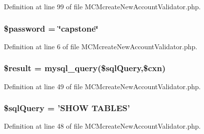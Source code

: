 Definition at line 99 of file M\-C\-Mcreate\-New\-Account\-Validator.\-php.

\hypertarget{_m_c_mcreate_new_account_validator_8php_a607686ef9f99ea7c42f4f3dd3dbb2b0d}{
\subsubsection[{\$password}]{\setlength{\rightskip}{0pt plus 5cm}\$password = \char`\"{}capstone\char`\"{}}}\label{_m_c_mcreate_new_account_validator_8php_a607686ef9f99ea7c42f4f3dd3dbb2b0d}


Definition at line 6 of file M\-C\-Mcreate\-New\-Account\-Validator.\-php.

\hypertarget{_m_c_mcreate_new_account_validator_8php_a112ef069ddc0454086e3d1e6d8d55d07}{
\subsubsection[{\$result}]{\setlength{\rightskip}{0pt plus 5cm}\$result = mysql\-\_\-query(\$sql\-Query,\$cxn)}}\label{_m_c_mcreate_new_account_validator_8php_a112ef069ddc0454086e3d1e6d8d55d07}


Definition at line 49 of file M\-C\-Mcreate\-New\-Account\-Validator.\-php.

\hypertarget{_m_c_mcreate_new_account_validator_8php_a08f961a26ebf8ad5411239bba701a67c}{
\subsubsection[{\$sql\-Query}]{\setlength{\rightskip}{0pt plus 5cm}\$sql\-Query = 'S\-H\-O\-W T\-A\-B\-L\-E\-S'}}\label{_m_c_mcreate_new_account_validator_8php_a08f961a26ebf8ad5411239bba701a67c}


Definition at line 48 of file M\-C\-Mcreate\-New\-Account\-Validator.\-php.


